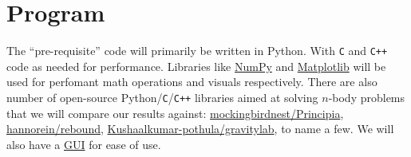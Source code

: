 \documentclass[hidelinks, 11pt, dvipsnames]{article}
\newcommand{\psubsection}[1]{
    \noindent 
    \section*{#1}
}
\begin{document}
\psubsection{Program}
The ``pre-requisite'' code will primarily be written in Python. With \texttt{C} and \texttt{C++} code as needed for performance. Libraries like \href{https://numpy.org/}{NumPy} and \href{https://matplotlib.org/}{Matplotlib} will be used for perfomant math operations and visuals respectively. There are also number of open-source Python/\texttt{C}/\texttt{C++} libraries aimed at solving $n$-body problems that we will compare our results against: \href{https://github.com/mockingbirdnest/Principia}{mockingbirdnest/Principia}, \href{https://github.com/hannorein/rebound}{hannorein/rebound}, \href{https://github.com/Kushaalkumar-pothula/gravitylab}{Kushaalkumar-pothula/gravitylab}, to name a few. We will also have a \href{https://www.qt.io/qt-for-python}{GUI} for ease of use.
\end{document}

